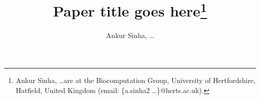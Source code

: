 \documentclass[letterpaper,conference,10pt,twocolumn]{IEEEtran}
\begin{document}
%

\title{\ \\ \LARGE\bf Paper title goes here\thanks{Ankur Sinha, \dots are at the Biocomputation Group, University of Hertfordshire, Hatfield, United Kingdom (email: \{a.sinha2 \dots \}@herts.ac.uk).}}

\author{Ankur Sinha, \dots}


\maketitle











\end{document}
